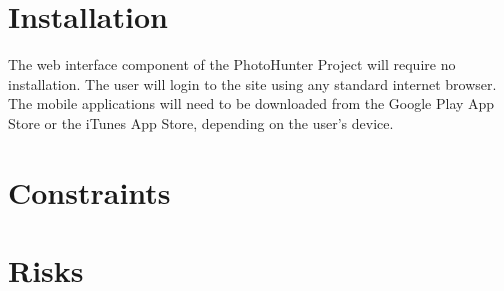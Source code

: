 \documentclass{article}
\begin{document}
\section{Installation}
The web interface component of the PhotoHunter Project will require no installation. The user will login to the site using any standard internet browser. The mobile applications will need to be downloaded from the Google Play App Store or the iTunes App Store, depending on the user's device.

\section{Constraints}


\section{Risks}

%
%

\end{document}
